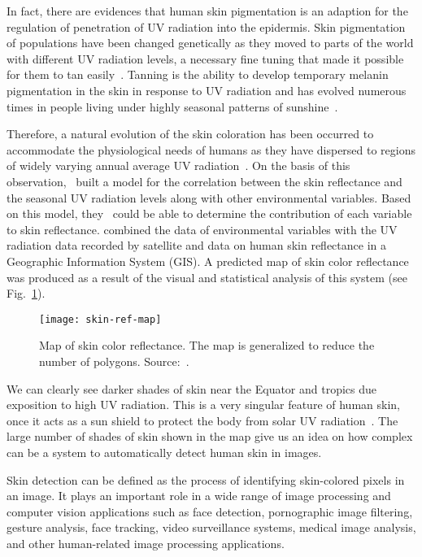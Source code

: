 In fact, there are evidences that human skin pigmentation is an adaption for the regulation of penetration of UV radiation into the epidermis. Skin pigmentation of populations have been changed genetically as they moved to parts of the world with different UV radiation levels, a necessary fine tuning that made it possible for them to tan easily~\citep{jablonski:00}. Tanning is the ability to develop temporary melanin pigmentation in the skin in response to UV radiation and has evolved numerous times in people living under highly seasonal patterns of sunshine~\citep{jablonski:10}.

Therefore, a natural evolution of the skin coloration has been occurred to accommodate the physiological needs of humans as they have dispersed to regions of widely varying annual average UV radiation~\citep{jablonski:10}. On the basis of this observation,~\citet{chaplin:04} built a model for the correlation between the skin reflectance and the seasonal UV radiation levels along with other environmental variables. Based on this model, they~\citep{chaplin:04} could be able to determine the contribution of each variable to skin reflectance. \citet{chaplin:04} combined the data of environmental variables with the UV radiation data recorded by satellite and data on human skin reflectance in a Geographic Information System (GIS). A predicted map of skin color reflectance was produced as a result of the visual and statistical analysis of this system (see Fig.~\ref{fig:skin-ref-map}).


\begin{figure}[!hb]
  \centering
  \texttt{[image: skin-ref-map]}
  \caption[Map of skin color reflectance]{Map of skin color reflectance. The map is generalized to reduce the number of polygons. Source:~\citet{chaplin:04}.}
  \label{fig:skin-ref-map}
\end{figure}

We can clearly see darker shades of skin near the Equator and tropics due exposition to high UV radiation. This is a very singular feature of human skin, once it acts as a sun shield to protect the body from solar UV radiation~\citep{jablonski:04}. The large number of shades of skin shown in the map give us an idea on how complex can be a system to automatically detect human skin in images.

Skin detection can be defined as the process of identifying skin-colored pixels in an image. It plays an important role in a wide range of image processing and computer vision applications such as face detection, pornographic image filtering, gesture analysis, face tracking, video surveillance systems, medical image analysis, and other human-related image processing applications.

